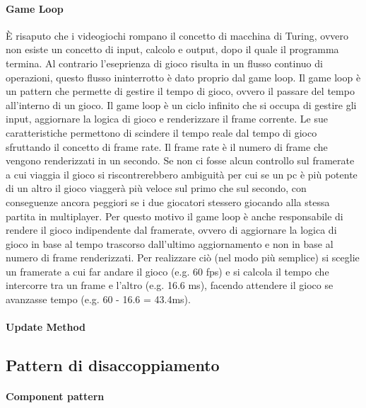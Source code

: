 \paragraph{Game Loop}
È risaputo che i videogiochi rompano il concetto di macchina di Turing, ovvero
non esiste un concetto di input, calcolo e output, dopo il quale il programma termina.
Al contrario l'eseprienza di gioco risulta in un flusso continuo di operazioni, questo
flusso ininterrotto è dato proprio dal game loop. Il game loop è un pattern che
permette di gestire il tempo di gioco, ovvero il passare del tempo all'interno
di un gioco. Il game loop è un ciclo infinito che si occupa di gestire gli input,
aggiornare la logica di gioco e renderizzare il frame corrente. 
Le sue caratteristiche permettono di scindere il tempo reale dal tempo di gioco 
sfruttando il concetto di frame rate. Il frame rate è il numero di frame che 
vengono renderizzati in un secondo. Se non ci fosse alcun controllo sul framerate a 
cui viaggia il gioco si riscontrerebbero ambiguità per cui se un pc è più 
potente di un altro il gioco viaggerà più veloce sul primo che sul secondo, 
con conseguenze ancora peggiori se i due giocatori stessero giocando alla 
stessa partita in multiplayer. Per questo motivo il game loop è anche 
responsabile di rendere il gioco indipendente dal framerate, ovvero di 
aggiornare la logica di gioco in base al tempo trascorso dall'ultimo aggiornamento
e non in base al numero di frame renderizzati. Per realizzare ciò (nel
modo più semplice) si sceglie un framerate a cui far andare il gioco (e.g. 60 
fps) e si calcola il tempo che intercorre tra un frame e l'altro (e.g. 16.6 ms),
facendo attendere il gioco se avanzasse tempo (e.g. 60 - 16.6 = 43.4ms).

\paragraph{Update Method}

\subsection{Pattern di disaccoppiamento}\label{ssec:PatternDisaccoppiamento}
\paragraph{Component pattern}
